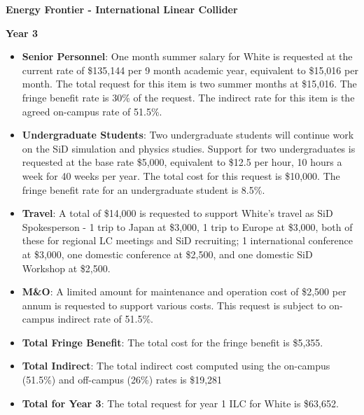 \textbf{Energy Frontier - International Linear Collider}

\textbf{Year 3}

\begin{itemize}

\item{{\bf Senior Personnel}: One month summer salary for White is requested at the current rate of \$135,144 per 9 month academic year, 
equivalent to \$15,016 per month.  The total request for this item is two summer months at \$15,016. The fringe benefit rate is 30\% of the request.  
The indirect rate for this item is the agreed on-campus rate of 51.5\%.}

\item {{\bf Undergraduate Students}: Two undergraduate students will continue work on the SiD simulation and physics studies.
Support for two undergraduates is requested at the base rate \$5,000, equivalent to \$12.5 per hour, 10 hours a week for 40 weeks per year.  
The total cost for this request is \$10,000.  The fringe benefit rate for an undergraduate student is 8.5\%.}

\item{{\bf Travel}: A total of \$14,000 is requested to support White's travel as SiD Spokesperson - 1 trip to Japan at \$3,000, 1 trip to
Europe at \$3,000, both of these for regional LC meetings and SiD recruiting; 1 international conference at \$3,000, one domestic conference 
at \$2,500, and one domestic SiD Workshop at \$2,500.}

\item {{\bf M\&O}: A limited amount for maintenance and operation cost of \$2,500 per annum is requested to support various costs.   
This request is subject to on-campus indirect rate of 51.5\%.}

\item {{\bf Total Fringe Benefit}: The total cost for the fringe benefit is \$5,355.}

\item {{\bf Total Indirect}: The total indirect cost computed using the on-campus (51.5\%) and off-campus (26\%) rates is \$19,281}

\item {{\bf Total for Year 3}: The total request for year 1 ILC for White is \$63,652.}

\end{itemize}